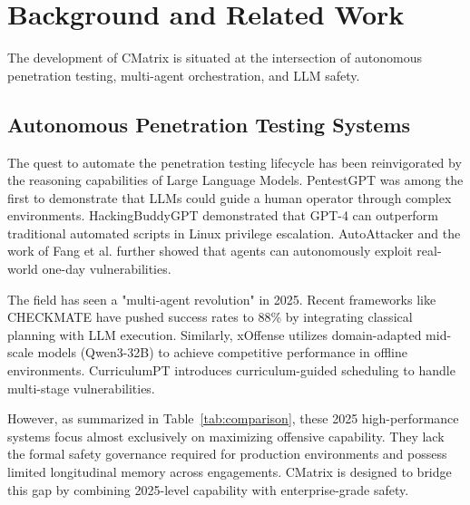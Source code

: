 \documentclass[conference,compsoc]{IEEEtran}
\begin{document}
\section{Background and Related Work} \label{sec:related}
The development of CMatrix is situated at the intersection of autonomous penetration testing, multi-agent orchestration, and LLM safety.

\subsection{Autonomous Penetration Testing Systems}
The quest to automate the penetration testing lifecycle has been reinvigorated by the reasoning capabilities of Large Language Models. PentestGPT \cite{pentestgpt} was among the first to demonstrate that LLMs could guide a human operator through complex environments. HackingBuddyGPT \cite{hackingbuddygpt} demonstrated that GPT-4 can outperform traditional automated scripts in Linux privilege escalation. AutoAttacker \cite{autoattacker} and the work of Fang et al. \cite{fang2024} further showed that agents can autonomously exploit real-world one-day vulnerabilities.

The field has seen a "multi-agent revolution" in 2025. Recent frameworks like CHECKMATE \cite{checkmate2025} have pushed success rates to 88\% by integrating classical planning with LLM execution. Similarly, xOffense \cite{xoffense2025} utilizes domain-adapted mid-scale models (Qwen3-32B) to achieve competitive performance in offline environments. CurriculumPT \cite{curriculumpt2025} introduces curriculum-guided scheduling to handle multi-stage vulnerabilities.

However, as summarized in Table~\ref{tab:comparison}, these 2025 high-performance systems focus almost exclusively on maximizing offensive capability. They lack the formal safety governance required for production environments and possess limited longitudinal memory across engagements. CMatrix is designed to bridge this gap by combining 2025-level capability with enterprise-grade safety.
\end{document}
